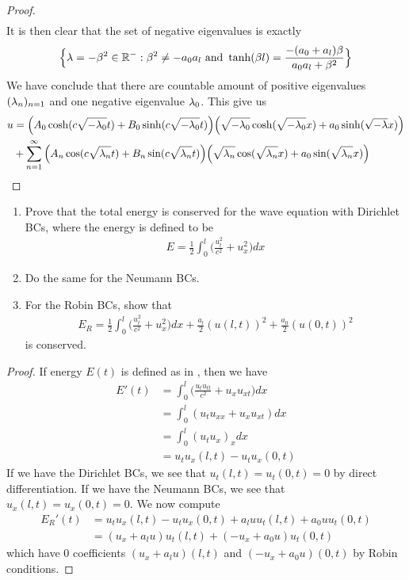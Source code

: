 \documentclass{report}
\begin{document}
\begin{proof}
\begin{align*}
\end{align*}
It is then clear that the set of negative eigenvalues is exactly 
\begin{align*}
\Big\{ \lambda =-\beta ^2\in\mathbb{R}^-: \beta^2\neq -a_0a_l\text{ and }\tanh (\beta l)= \frac{-(a_0+a_l)\beta }{a_0a_l+\beta ^2} \Big\}
\end{align*}
We have conclude that there are countable amount of positive eigenvalues $(\lambda_n)_{n=1}$ and one negative eigenvalue $\lambda _0$. This give us 
\begin{align*}
u&=\Big(A_0\cosh (c\sqrt{-\lambda_0}t)+B_0\sinh (c \sqrt{-\lambda_0}t ) \Big)\Big( \sqrt{-\lambda_0}  \cosh (\sqrt{-\lambda_0}x )+ a_0 \sinh (\sqrt{-\lambda }x )  \Big) \\
&+\sum_{n=1}^{\infty} \Big(A_n \cos (c\sqrt{\lambda _n}t )+B_n \sin (c\sqrt{\lambda _n} t) \Big) \Big( \sqrt{\lambda _n}\cos (\sqrt{\lambda _n}x )+ a_0 \sin (\sqrt{\lambda _n}x )  \Big)
\end{align*}
\end{proof}
\begin{question}{}{}
\begin{enumerate}[label=(\alph*)]
  \item Prove that the total energy is conserved for the wave equation with Dirichlet BCs, where the energy is defined to be 
    \begin{align}
    \label{ee}
    E= \frac{1}{2}\int_0^l \Big(\frac{u_t^2}{c^2}+u_x^2\Big)dx
    \end{align} 
    \item Do the same for the Neumann BCs. 
    \item For the Robin BCs, show that 
      \begin{align*}
      E_R= \frac{1}{2}\int_0^l \Big(\frac{u_t^2}{c^2}+u_x^2\Big)dx + \frac{a_l}{2}(u(l,t))^2 + \frac{a_0}{2}(u(0,t))^2
      \end{align*}
      is conserved. 
\end{enumerate}
\end{question}
\begin{proof}
If energy $E(t)$ is defined as in , then we have 
\begin{align*}
E'(t)&= \int_0^l \Big( \frac{u_tu_{tt}}{c^2}+u_xu_{xt} \Big)dx \\
&=\int_0^l (u_tu_{xx}+u_xu_{xt})dx \\
&=\int_0^l (u_tu_x)_xdx\\
&= u_tu_x(l,t)-u_tu_x(0,t)
\end{align*}
If we have the Dirichlet BCs, we see that $u_t(l,t)=u_t(0,t)=0$ by direct differentiation. If we have the Neumann BCs, we see that $u_x(l,t)=u_x(0,t)=0$. We now compute 
\begin{align*}
E_R'(t)&= u_tu_x(l,t)-u_tu_x(0,t)+ a_luu_t(l,t)+ a_0uu_t(0,t) \\
&=(u_x+a_lu)u_t(l,t)+ ( -u_x+  a_0u)u_t(0,t)
\end{align*}
which have $0$ coefficients  $(u_x+a_lu)(l,t)$ and $(-u_x+a_0u)(0,t)$ by Robin conditions. 
\end{proof}
\end{document}
